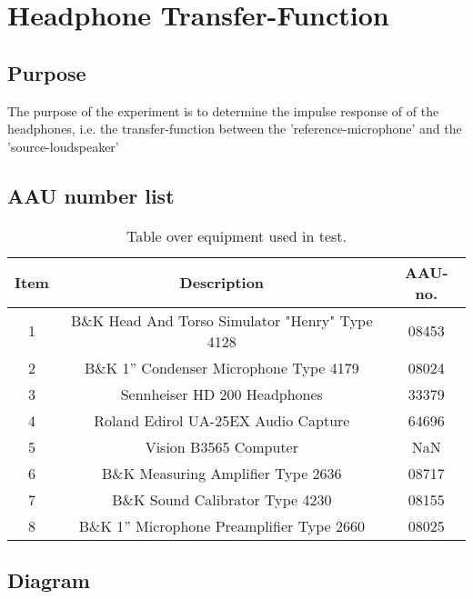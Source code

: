 \section{Headphone Transfer-Function}
\subsection{Purpose}
The purpose of the experiment is to determine the impulse response of of the  headphones, i.e. the transfer-function between the 'reference-microphone' and the 'source-loudspeaker'

\subsection{AAU number list}
\begin{table}[H]
	\centering
	\begin{tabular}{ c c c } \toprule
		{Item}	& {Description} 						& {AAU-no}. \\ \bottomrule 
		1	&	B\&K Head And Torso Simulator "Henry" Type 4128	& 08453		\\
		2	&	B\&K 1'' Condenser Microphone Type 4179 & 08024\\
		3	&	Sennheiser HD 200	Headphones			& 33379		\\
		4	&	Roland Edirol UA-25EX Audio Capture		& 64696		\\
		5	&	Vision B3565 Computer					& NaN		\\
		6	&	B\&K Measuring Amplifier Type 2636	& 08717		\\
		7	&	B\&K Sound Calibrator Type 4230			& 08155		\\ 
		8	&	B\&K 1'' Microphone Preamplifier Type 2660	& 08025		\\
		\bottomrule
	\end{tabular}
	\caption{Table over equipment used in test.}
	\label{tab:UsedEquipmentListningHP}
\end{table}

\subsection{Diagram}


